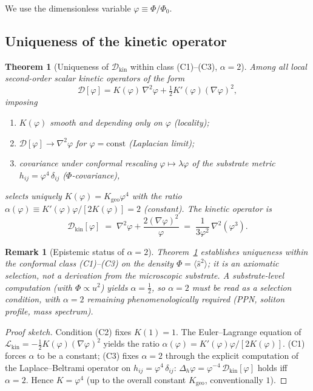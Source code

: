 \documentclass[11pt,a4paper]{article}
\renewcommand{\Phi}{\varPhi}
\newcommand{\PhiZero}{\varPhi_{0}}
\newcommand{\DD}{\mathcal{D}}
\newtheorem{theorem}[axiom]{Theorem}
\newtheorem{remark}[axiom]{Remark}
\begin{document}
We use the dimensionless variable $\varphi \equiv \Phi/\PhiZero$.

\subsection{Uniqueness of the kinetic operator}

\begin{theorem}[Uniqueness of $\DD_{\mathrm{kin}}$ within class (C1)--(C3), $\alpha=2$]\label{thm:alpha2}
Among all local second-order scalar kinetic operators of the form
\begin{equation}
  \DD[\varphi]
  = K(\varphi)\,\nabla^{2}\varphi
  + \tfrac{1}{2}K'(\varphi)(\nabla\varphi)^{2},
\end{equation}
imposing
\begin{enumerate}[(C1),nosep]
  \item $K(\varphi)$ smooth and depending only on $\varphi$ (locality);
  \item $\DD[\varphi]\to\nabla^{2}\varphi$ for $\varphi=\mathrm{const}$
    (Laplacian limit);
  \item covariance under conformal rescaling $\varphi\mapsto\lambda\varphi$
    of the substrate metric $h_{ij}=\varphi^{4}\,\delta_{ij}$
    ($\Phi$-covariance),
\end{enumerate}
selects uniquely $K(\varphi)=K_{\mathrm{geo}}\varphi^{4}$ with the
ratio $\alpha(\varphi)\equiv K'(\varphi)\varphi/[2K(\varphi)]=2$ (constant).
The kinetic operator is
\begin{equation}\label{eq:Dkin}
  \boxed{\;
    \DD_{\mathrm{kin}}[\varphi]
    \;=\;\nabla^{2}\varphi+\frac{2(\nabla\varphi)^{2}}{\varphi}
    \;=\;\frac{1}{3\varphi^{2}}\,\nabla^{2}(\varphi^{3}).
  \;}
\end{equation}
\end{theorem}

\begin{remark}[Epistemic status of $\alpha=2$]
Theorem~\ref{thm:alpha2} establishes \emph{uniqueness within the conformal
class} (C1)--(C3) on the density $\Phi=\langle\hat s^2\rangle$; it is an
\emph{axiomatic selection}, not a derivation from the microscopic substrate.
A substrate-level computation (with $\Phi\propto u^2$) yields $\alpha=\tfrac12$,
so $\alpha=2$ must be read as a selection condition, with $\alpha=2$ remaining
phenomenologically required (PPN, soliton profile, mass spectrum).
\end{remark}

\begin{proof}[Proof sketch]
Condition (C2) fixes $K(1)=1$. The Euler--Lagrange equation of
$\mathcal{L}_{\mathrm{kin}}=-\tfrac{1}{2}K(\varphi)(\nabla\varphi)^{2}$
yields the ratio $\alpha(\varphi)=K'(\varphi)\varphi/[2K(\varphi)]$.
(C1) forces $\alpha$ to be a constant; (C3) fixes $\alpha=2$ through the
explicit computation of the Laplace--Beltrami operator on
$h_{ij}=\varphi^{4}\,\delta_{ij}$:
$\Delta_{h}\varphi=\varphi^{-4}\,\DD_{\mathrm{kin}}[\varphi]$ holds
iff $\alpha=2$. Hence $K=\varphi^{4}$ (up to the overall constant
$K_{\mathrm{geo}}$, conventionally $1$).
\end{proof}
\end{document}
